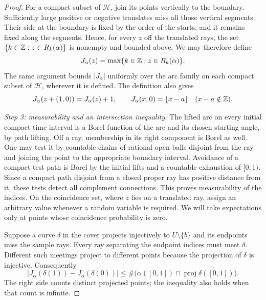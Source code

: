 \begin{proof}
For a compact subset of $\mathcal H$, join its points vertically to
the boundary.  Sufficiently large positive or negative translates
miss all those vertical segments.  Their side at the boundary is
fixed by the order of the starts, and it remains fixed along the
segments.  Hence, for every $z$ off the translated rays, the set
$\{k\in\mathbb Z:z\in R_k(\alpha)\}$ is nonempty and bounded above.  We may
therefore define
\begin{equation}\label{eq:ray-index}
 J_\alpha(z)=\max\{k\in\mathbb Z:z\in R_k(\alpha)\}.
\end{equation}
The same argument bounds $|J_\alpha|$ uniformly over the arc family
on each compact subset of $\mathcal H$, wherever it is defined.
The definition also gives
\begin{equation}\label{eq:ray-index-period}
 J_\alpha(z+(1,0))=J_\alpha(z)+1,
 \qquad J_\alpha(x,0)=\lfloor x-a\rfloor
 \quad(x-a\notin\mathbb Z).
\end{equation}

\smallskip\noindent\emph{Step 3: measurability and an intersection inequality.}
The lifted arc on every initial compact time interval is a Borel
function of the arc and its chosen starting angle, by path lifting.
Off a ray, membership in its right component is Borel as well.  One
may test it by countable chains of rational open balls disjoint from
the ray and joining the point to the appropriate boundary interval.
Avoidance of a compact test path is Borel by the initial lifts and a
countable exhaustion of $[0,1)$.  Since a compact path disjoint from a
closed proper ray has positive distance from it, these tests detect
all complement connections.  This proves measurability of the
indices.  On the coincidence set, where $z$ lies on a translated ray,
assign an arbitrary value whenever a random variable is required.  We
will take expectations only at points whose coincidence probability is
zero.

Suppose a curve $\delta$ in the cover projects injectively to
$\overline U\setminus\{b\}$ and its endpoints miss the sample rays.
Every ray separating the endpoint indices must meet $\delta$.
Different such meetings project to different points because the
projection of $\delta$ is injective.  Consequently
\begin{equation}\label{eq:index-intersections}
 |J_\alpha(\delta(1))-J_\alpha(\delta(0))|
 \le \#\bigl(\alpha([0,1])\cap\operatorname{proj}\delta([0,1])\bigr).
\end{equation}
The right side counts distinct projected points; the inequality also
holds when that count is infinite.


\end{proof}
